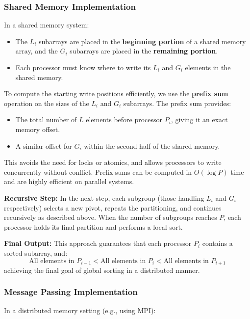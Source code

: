 \documentclass[12pt]{book}
\begin{document}
\subsubsection{Shared Memory Implementation}

In a shared memory system:

\begin{itemize}
    \item The $L_i$ subarrays are placed in the \textbf{beginning portion} of a shared memory array, and the $G_i$ subarrays are placed in the \textbf{remaining portion}.
    \item Each processor must know where to write its $L_i$ and $G_i$ elements in the shared memory.
\end{itemize}

To compute the starting write positions efficiently, we use the \textbf{prefix sum} operation on the sizes of the $L_i$ and $G_i$ subarrays. The prefix sum provides:
\begin{itemize}
    \item The total number of $L$ elements before processor $P_i$, giving it an exact memory offset.
    \item A similar offset for $G_i$ within the second half of the shared memory.
\end{itemize}

This avoids the need for locks or atomics, and allows processors to write concurrently without conflict. Prefix sums can be computed in $O(\log P)$ time and are highly efficient on parallel systems.

\textbf{Recursive Step:}  
In the next step, each subgroup (those handling $L_i$ and $G_i$ respectively) selects a new pivot, repeats the partitioning, and continues recursively as described above. When the number of subgroups reaches $P$, each processor holds its final partition and performs a local sort.

\textbf{Final Output:}  
This approach guarantees that each processor $P_i$ contains a sorted subarray, and:
\[
\text{All elements in } P_{i-1} <\text{All elements in } P_i < \text{All elements in } P_{i+1}
\]
achieving the final goal of global sorting in a distributed manner.

\subsubsection{Message Passing Implementation}

In a distributed memory setting (e.g., using MPI):
\end{document}
